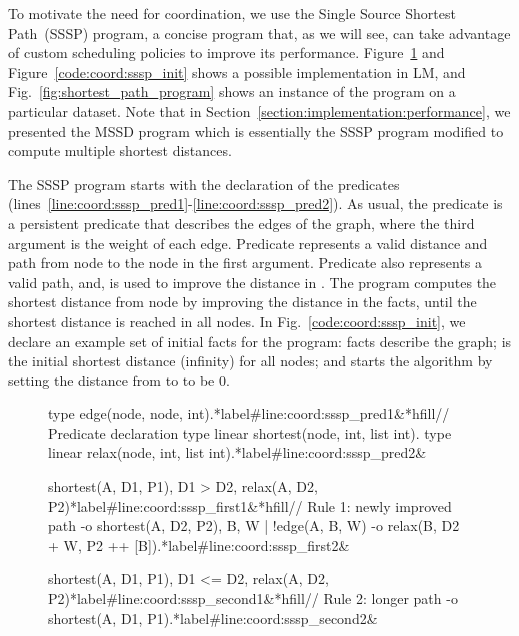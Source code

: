 To motivate the need for coordination, we use the Single Source Shortest
Path~(SSSP) program, a concise program that, as we will see, can take advantage
of custom scheduling policies to improve its performance.
Figure~\ref{code:shortest_path_program} and Figure~\ref{code:coord:sssp_init}
shows a possible implementation in LM, and Fig.~\ref{fig:shortest_path_program}
shows an instance of the program on a particular dataset. Note that in
Section~\ref{section:implementation:performance}, we presented the
MSSD program which is essentially the SSSP program modified to compute multiple
shortest distances.

The SSSP program starts with the declaration of the predicates~
(lines~\ref{line:coord:sssp_pred1}-\ref{line:coord:sssp_pred2}). As usual, the
 predicate is a persistent predicate that describes the edges of the
graph, where the third argument is the weight of each edge. Predicate
 represents a valid distance and path from node  to the
node in the first argument.  Predicate  also represents a valid
path, and, is used to improve the distance in .  The program
computes the shortest distance from node  by improving the distance in
the  facts, until the shortest distance is reached in all nodes.
In Fig.~\ref{code:coord:sssp_init}, we declare an example set of initial facts
for the program:  facts describe the graph;  is the initial shortest distance (infinity) for all nodes; and
 starts the algorithm by setting the distance from
 to  to be 0.

\begin{figure}[ht]
\begin{LineCode}[commandchars=\*\#\&]
type edge(node, node, int).*label#line:coord:sssp_pred1&*hfill// Predicate declaration
type linear shortest(node, int, list int).
type linear relax(node, int, list int).*label#line:coord:sssp_pred2&

shortest(A, D1, P1), D1 > D2, relax(A, D2, P2)*label#line:coord:sssp_first1&*hfill// Rule 1: newly improved path
   -o shortest(A, D2, P2),
      {B, W | !edge(A, B, W) -o relax(B, D2 + W, P2 ++ [B])}.*label#line:coord:sssp_first2&

shortest(A, D1, P1), D1 <= D2, relax(A, D2, P2)*label#line:coord:sssp_second1&*hfill// Rule 2: longer path
   -o shortest(A, D1, P1).*label#line:coord:sssp_second2&
\end{LineCode}
\label{code:shortest_path_program}
\end{figure}

